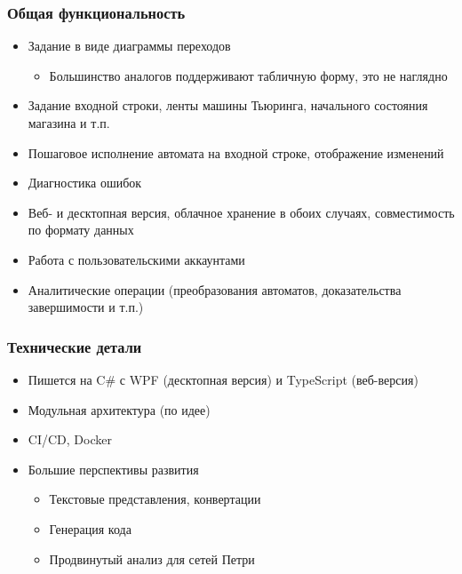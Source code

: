 \documentclass[xetex,mathserif,serif]{beamer}
\begin{document}
    \begin{frame}
        \frametitle{Общая функциональность}
        \begin{itemize}
            \item Задание в виде диаграммы переходов
            \begin{itemize}
                \item Большинство аналогов поддерживают табличную форму, это не наглядно
            \end{itemize}
            \item Задание входной строки, ленты машины Тьюринга, начального состояния магазина и т.п.
            \item Пошаговое исполнение автомата на входной строке, отображение изменений
            \item Диагностика ошибок
            \item Веб- и десктопная версия, облачное хранение в обоих случаях, совместимость по формату данных
            \item Работа с пользовательскими аккаунтами
            \item Аналитические операции (преобразования автоматов, доказательства завершимости и т.п.)
        \end{itemize}
    \end{frame}

    \begin{frame}
        \frametitle{Технические детали}
        \begin{itemize}
            \item Пишется на C\# с WPF (десктопная версия) и TypeScript (веб-версия)
            \item Модульная архитектура (по идее)
            \item CI/CD, Docker
            \item Большие перспективы развития
            \begin{itemize}
                \item Текстовые представления, конвертации
                \item Генерация кода
                \item Продвинутый анализ для сетей Петри
            \end{itemize}
        \end{itemize}
    \end{frame}
\end{document}
